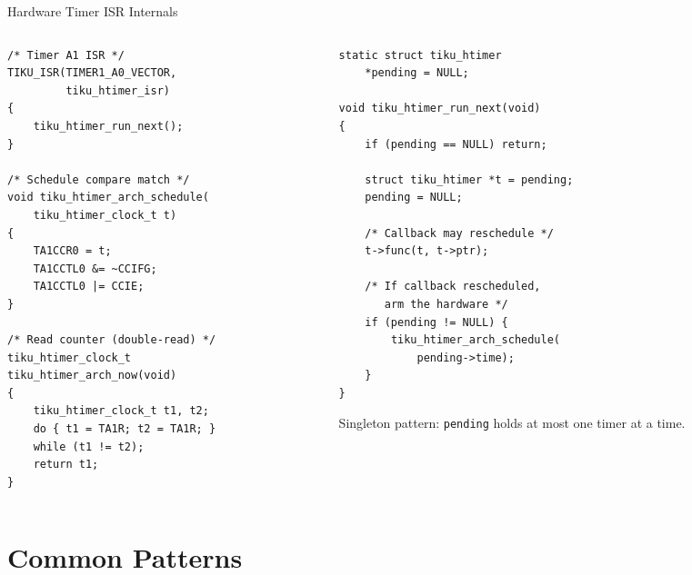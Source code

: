 \documentclass[aspectratio=169, 10pt]{beamer}
\begin{document}
\begin{frame}[fragile]{Hardware Timer ISR Internals}
\begin{columns}[T]
\begin{column}{0.48\textwidth}
\begin{lstlisting}[style=cstyle,
  title={arch/msp430/tiku\_htimer\_arch.c}]
/* Timer A1 ISR */
TIKU_ISR(TIMER1_A0_VECTOR,
         tiku_htimer_isr)
{
    tiku_htimer_run_next();
}

/* Schedule compare match */
void tiku_htimer_arch_schedule(
    tiku_htimer_clock_t t)
{
    TA1CCR0 = t;
    TA1CCTL0 &= ~CCIFG;
    TA1CCTL0 |= CCIE;
}

/* Read counter (double-read) */
tiku_htimer_clock_t
tiku_htimer_arch_now(void)
{
    tiku_htimer_clock_t t1, t2;
    do { t1 = TA1R; t2 = TA1R; }
    while (t1 != t2);
    return t1;
}
\end{lstlisting}
\end{column}

\begin{column}{0.48\textwidth}
\begin{lstlisting}[style=cstyle,
  title={kernel/timers/tiku\_htimer.c}]
static struct tiku_htimer
    *pending = NULL;

void tiku_htimer_run_next(void)
{
    if (pending == NULL) return;

    struct tiku_htimer *t = pending;
    pending = NULL;

    /* Callback may reschedule */
    t->func(t, t->ptr);

    /* If callback rescheduled,
       arm the hardware */
    if (pending != NULL) {
        tiku_htimer_arch_schedule(
            pending->time);
    }
}
\end{lstlisting}

\vspace{0.3em}
Singleton pattern: \texttt{pending} holds
at most one timer at a time.
\end{column}
\end{columns}
\end{frame}

\section{Common Patterns}
\end{document}
